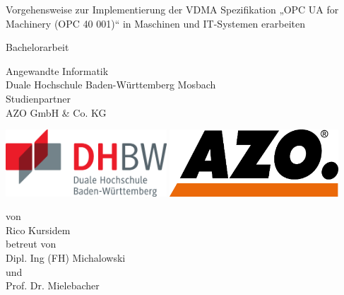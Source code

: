 \def\doctype{Bachelorarbeit}
\def\title{Vorgehensweise zur Implementierung der VDMA Spezifikation „OPC UA for Machinery (OPC 40 001)“ in Maschinen und IT-Systemen erarbeiten}
\def\author{Rico Kursidem}
\def\supervisor{Dipl. Ing (FH) Michalowski}
\def\supervisortwo{Prof. Dr. Mielebacher}

\begin{titlepage}

\vspace{10mm}

\begin{center}
	
	\vspace{5mm}
	\huge \title
	
	\vspace{34pt}
	\large \doctype
		
	\vspace{30pt}	
	\small Angewandte Informatik \\
	\large Duale Hochschule Baden-Württemberg Mosbach \\
	\small Studienpartner \\
	\large AZO GmbH \& Co. KG \\
    \vspace{35pt}
    
    \includegraphics[height=2.5cm]{prefix/image/logo-dhbw.eps}
    \includegraphics[height=2.5cm]{prefix/image/logo-azo.png}
	
	\vspace{40pt}	
	\small von \\
	\large \author \\
	\small betreut von \\
	\large \supervisor \\
	\small und \\
	\large \supervisortwo

\end{center}

\vspace{75pt}


\vspace{49.7pt}


\end{titlepage}